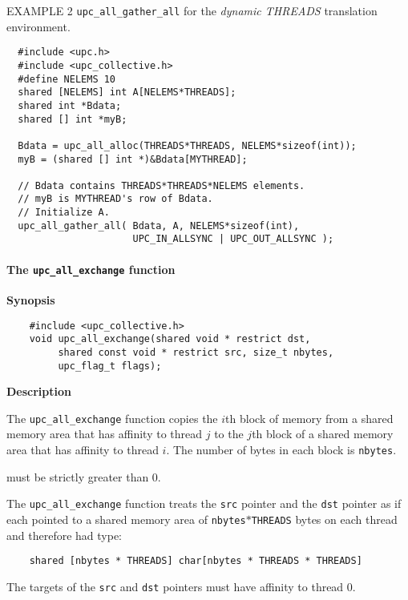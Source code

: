 \np EXAMPLE 2 {\tt upc\_all\_gather\_all} for the {\em dynamic THREADS}
translation environment.

\begin{verbatim}
  #include <upc.h>
  #include <upc_collective.h>
  #define NELEMS 10
  shared [NELEMS] int A[NELEMS*THREADS];
  shared int *Bdata;
  shared [] int *myB;

  Bdata = upc_all_alloc(THREADS*THREADS, NELEMS*sizeof(int));
  myB = (shared [] int *)&Bdata[MYTHREAD];

  // Bdata contains THREADS*THREADS*NELEMS elements.
  // myB is MYTHREAD's row of Bdata.
  // Initialize A.
  upc_all_gather_all( Bdata, A, NELEMS*sizeof(int),
                      UPC_IN_ALLSYNC | UPC_OUT_ALLSYNC );
\end{verbatim}

\paragraph{The {\tt upc\_all\_exchange} function}

{\bf Synopsis} 

\npf\vspace{-2.5em}
\begin{verbatim}
    #include <upc_collective.h>
    void upc_all_exchange(shared void * restrict dst, 
         shared const void * restrict src, size_t nbytes,
         upc_flag_t flags);
\end{verbatim}

{\bf Description} 

\np The {\tt upc\_all\_exchange} function copies the $i$th block of memory
from a shared memory area that has affinity to thread $j$ to the $j$th block
of a shared memory area that has affinity to thread $i$.
The number of bytes in each block is {\tt nbytes}.

 must be strictly greater than 0.

\np The {\tt upc\_all\_exchange} function treats the {\tt src} pointer
and the {\tt dst} pointer as if each
pointed to a shared memory area of {\tt nbytes}$*${\tt THREADS} bytes
on each thread and therefore had type:

\begin{verbatim}
    shared [nbytes * THREADS] char[nbytes * THREADS * THREADS]
\end{verbatim}  

\np The targets of the {\tt src} and {\tt dst} pointers
must have affinity to thread 0.

